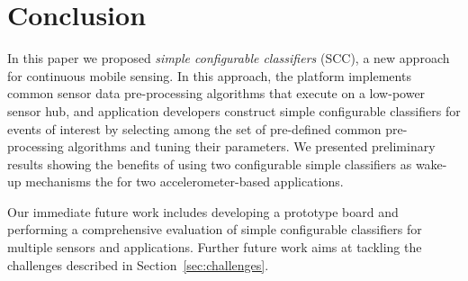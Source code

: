 \section{Conclusion}
\label{sec:conclusion}

In this paper we proposed {\em simple configurable classifiers} (SCC),
a new approach for continuous mobile sensing.  In this approach, the
platform implements common sensor data pre-processing algorithms that
execute on a low-power sensor hub, and application developers
construct simple configurable classifiers for events of interest by
selecting among the set of pre-defined common pre-processing
algorithms and tuning their parameters.  We presented preliminary
results showing the benefits of using two configurable simple
classifiers as wake-up mechanisms the for two accelerometer-based
applications.

Our immediate future work includes developing a prototype board and 
performing a comprehensive evaluation of simple configurable 
classifiers for multiple sensors and applications. Further future work 
aims at tackling the challenges described in Section~\ref{sec:challenges}.  
